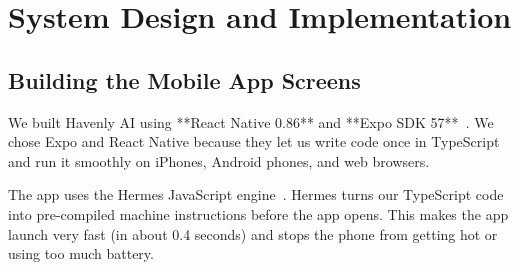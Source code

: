 \chapter{System Design and Implementation}
\label{chap:design_impl}

\section{Building the Mobile App Screens}
\label{sec:impl_frontend}

We built Havenly AI using **React Native 0.86** and **Expo SDK 57**~\cite{expo2024sdk57}. We chose Expo and React Native because they let us write code once in TypeScript and run it smoothly on iPhones, Android phones, and web browsers.

The app uses the Hermes JavaScript engine~\cite{reactnative2024hermes}. Hermes turns our TypeScript code into pre-compiled machine instructions before the app opens. This makes the app launch very fast (in about 0.4 seconds) and stops the phone from getting hot or using too much battery.

